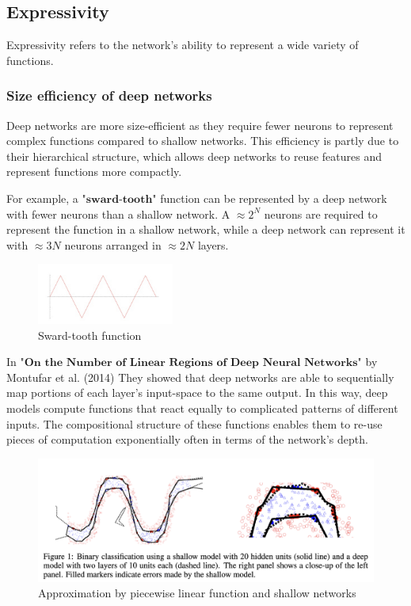 \documentclass[11pt]{book} %
\begin{document}
\subsection{Expressivity}
Expressivity refers to the network's ability to represent a wide variety of functions.

\subsubsection{Size efficiency of deep networks}
Deep networks are more size-efficient as they require fewer neurons to represent complex functions compared to shallow networks.
This efficiency is partly due to their hierarchical structure, which allows deep networks to reuse features and represent functions more compactly.

For example, a $\textbf{"sward-tooth"}$ function can be represented by a deep network with fewer neurons than a shallow network.
A $\approx 2^N$ neurons are required to represent the function in a shallow network, 
while a deep network can represent it with $\approx 3N$ neurons arranged in $\approx 2N$ layers.

\begin{figure}[ht]
    \centering
    \includegraphics[width=0.4\textwidth]{./Figs/sward-tooth.jpeg}
    \caption{Sward-tooth function}
    \label{fig:size_efficiency_deep_networks}
\end{figure}

In $\textbf{"On the Number of Linear Regions of Deep Neural Networks"}$ by Montufar et al. (2014)
They showed that deep networks are able to sequentially map portions of each layer's input-space to the same output. 
In this way, deep models compute functions that react equally to complicated patterns of different inputs.
The compositional structure of these functions enables them to re-use pieces of computation exponentially often in terms of the network's depth. 

\begin{figure}[ht]
    \centering
    \includegraphics[width=\textwidth]{./Figs/piecewise_linear_function.png}
    \caption{Approximation by piecewise linear function and shallow networks}
    \label{fig:size_efficiency_deep_networks}
\end{figure}
\end{document}
